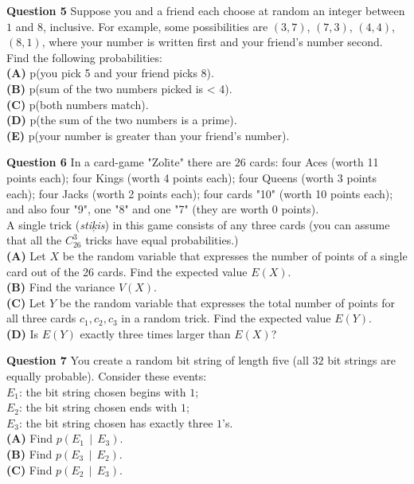 \documentclass[jou]{apa6}
\begin{document}
\vspace{10pt}
{\bf Question 5} Suppose you and a friend each choose at random an integer between $1$ and $8$, inclusive. For example, some
possibilities are $(3,7)$, $(7,3)$, $(4,4)$, $(8,1)$, where your number is written first and your friend’s number second.
Find the following probabilities:\\
{\bf (A)} p(you pick 5 and your friend picks 8).\\
{\bf (B)} p(sum of the two numbers picked is < 4).\\
{\bf (C)} p(both numbers match).\\
{\bf (D)} p(the sum of the two numbers is a prime).\\
{\bf (E)} p(your number is greater than your friend’s number).

\vspace{10pt}
{\bf Question 6} In a card-game "Zol\={\i}te" there are $26$ cards: four Aces (worth 11 points each); 
four Kings (worth 4 points each); four Queens (worth 3 points each); four Jacks (worth 2 points each); 
four cards "10" (worth 10 points each); and also four "9", one "8" and one "7" (they are worth 0 points).\\
A single trick ({\em sti\c{k}is}) in this game consists of any three cards (you can assume that all the 
$C_{26}^3$ tricks have equal probabilities.)\\
{\bf (A)} Let $X$ be the random variable that expresses the number of points of a single card out 
of the 26 cards.  Find the expected value $E(X)$.\\
{\bf (B)} Find the variance $V(X)$.\\
{\bf (C)} Let $Y$ be the random variable that expresses the total number of points for all three
cards $c_1,c_2,c_3$ in a random trick. Find the expected value $E(Y)$.\\
{\bf (D)} Is $E(Y)$ exactly three times larger than $E(X)$?

\vspace{10pt}
{\bf Question 7} You create a random bit string of length five (all $32$ bit strings are equally probable). Consider
these events:\\
$E_1$: the bit string chosen begins with $1$;\\
$E_2$: the bit string chosen ends with $1$;\\
$E_3$: the bit string chosen has exactly three $1$’s.\\
{\bf (A)} Find $p(E_1 \,\mid\, E_3)$.\\
{\bf (B)} Find $p(E_3 \,\mid\, E_2)$.\\
{\bf (C)} Find $p(E_2 \,\mid\, E_3)$.
\end{document}

